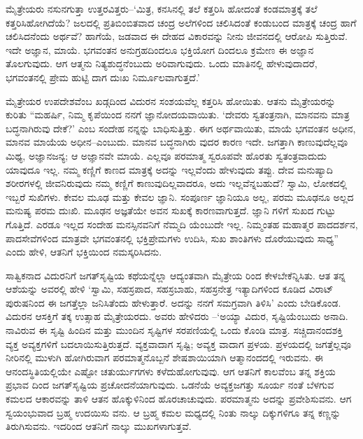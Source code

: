 ಮೈತ್ರೇಯರು ನಸುನಗುತ್ತಾ ಉತ್ತರವಿತ್ತರು–‘ಮಿತ್ರ, ಕನಸಿನಲ್ಲಿ ತಲೆ ಕತ್ತರಿಸಿ ಹೋದಂತೆ ಕಂಡಮಾತ್ರಕ್ಕೆ ತಲೆ ಕತ್ತರಿಸಿಹೋಗಿದೆಯೆ? ಜಲದಲ್ಲಿ ಪ್ರತಿಬಿಂಬಿತವಾದ ಚಂದ್ರ ಅಲೆಗಳಿಂದ ಚಲಿಸಿದಂತೆ ಕಂಡುಬಂದ ಮಾತ್ರಕ್ಕೆ ಚಂದ್ರ ಹಾಗೆ ಚಲಿಸಿದನೆಂದು ಅರ್ಥವೆ? ಹಾಗೆಯೆ, ಜಡವಾದ ಈ ದೇಹದ ವಿಕಾರವನ್ನು ನೀನು ಜೀವನದಲ್ಲಿ ಆರೋಪಿ ಸುತ್ತಿರುವೆ. ಇದೇ ಅಜ್ಞಾನ, ಮಾಯೆ. ಭಗವಂತನ ಅನುಗ್ರಹದಿಂದಲೂ ಭಕ್ತಿಯೋಗ ದಿಂದಲೂ ಕ್ರಮೇಣ ಈ ಅಜ್ಞಾನ ತೊಲಗುವುದು. ಆಗ ಆತ್ಮನು ನಿತ್ಯಶುದ್ಧನೆಂಬುದು ಅರಿವಾಗುವುದು. ಒಂದು ಮಾತಿನಲ್ಲಿ ಹೇಳುವುದಾದರೆ, ಭಗವಂತನಲ್ಲಿ ಪ್ರೇಮ ಹುಟ್ಟಿ ದಾಗ ದುಃಖ ನಿರ್ಮೂಲವಾಗುತ್ತದೆ.’

ಮೈತ್ರೇಯರ ಉಪದೇಶವೆಂಬ ಖಡ್ಗದಿಂದ ವಿದುರನ ಸಂಶಯವೆಲ್ಲ ಕತ್ತರಿಸಿ ಹೋಯಿತು. ಆತನು ಮೈತ್ರೇಯರನ್ನು ಕುರಿತು “ಮಹರ್ಷಿ, ನಿಮ್ಮ ಕೃಪೆಯಿಂದ ನನಗೆ ಜ್ಞಾನೋದಯವಾಯಿತು. ‘ದೇವರು ಸ್ವತಂತ್ರನಾಗಿ, ಮಾನವನು ಮಾತ್ರ ಬದ್ಧನಾಗಿರುವು ದೇಕೆ?’ ಎಂಬ ಸಂದೇಹ ನನ್ನನ್ನು ಬಾಧಿಸುತ್ತಿತ್ತು. ಈಗ ಅರ್ಥವಾಯಿತು, ಮಾಯೆ ಭಗವಂತನ ಅಧೀನ, ಮಾನವ ಮಾಯೆಯ ಅಧೀನ–ಎಂಬುದು. ಮಾನವ ಬದ್ಧನಾಗಿರು ವುದರ ಕಾರಣ ಇದೇ. ಜಗತ್ತಾಗಿ ಕಾಣುವುದೆಲ್ಲವೂ ಮಿಥ್ಯ, ಅಜ್ಞಾನಜನ್ಯ; ಆ ಅಜ್ಞಾನವೇ ಮಾಯೆ. ಎಲ್ಲವೂ ಪರಮಾತ್ಮ ಸ್ವರೂಪವೇ ಹೊರತು ಸ್ವತಂತ್ರವಾದುದು ಯಾವುದೂ ಇಲ್ಲ. ನಮ್ಮ ಕಣ್ಣಿಗೆ ಕಾಣದ ಮಾತ್ರಕ್ಕೆ ಅದನ್ನು ಇಲ್ಲವೆಂದು ಹೇಳುವುದು ತಪ್ಪು. ದೇವ ಮನುಷ್ಯಾದಿ ಶರೀರಗಳಲ್ಲಿ ಜೀವನಿರುವುದು ನಮ್ಮ ಕಣ್ಣಿಗೆ ಕಾಣುವುದಿಲ್ಲವಾದರೂ, ಅದು ಇಲ್ಲವೆನ್ನಬಹುದೆ? ಸ್ವಾಮಿ, ಲೋಕದಲ್ಲಿ ಇಬ್ಬರೆ ಸುಖಿಗಳು. ಕೇವಲ ಮೂಢ ಮತ್ತು ಕೇವಲ ಜ್ಞಾನಿ. ಸಂಪೂರ್ಣ ಜ್ಞಾನಿಯೂ ಅಲ್ಲ, ಪರಮ ಮೂಢನೂ ಅಲ್ಲದ ಮನುಷ್ಯ ಪರಮ ದುಃಖಿ. ಮೂಢನ ಅಜ್ಞತೆಯೇ ಅವನ ಸುಖಕ್ಕೆ ಕಾರಣವಾಗುತ್ತದೆ. ಜ್ಞಾನಿ ಗಳಿಗೆ ಸುಖದ ಗುಟ್ಟು ಗೊತ್ತಿದೆ. ಎರಡೂ ಇಲ್ಲದ ಸಂದೇಹ ಮನಸ್ಸಿನವನಿಗೆ ನೆಮ್ಮದಿ ಯೆಂಬುದೇ ಇಲ್ಲ. ನಿಮ್ಮಂತಹ ಮಹಾತ್ಮರ ಪಾದದರ್ಶನ, ಪಾದಸೇವೆಗಳಿಂದ ಮಾತ್ರವೇ ಭಗವಂತನಲ್ಲಿ ಭಕ್ತಿಪ್ರೇಮಗಳು ಉದಿಸಿ, ಸುಖ ಶಾಂತಿಗಳು ದೊರೆಯುವುದು ಸಾಧ್ಯ” ಎಂದು ಹೇಳಿ, ಆತನಿಗೆ ಭಕ್ತಿಯಿಂದ ನಮಸ್ಕರಿಸಿದನು.

ಸಾತ್ವಿಕನಾದ ವಿದುರನಿಗೆ ಜಗತ್​ಸೃಷ್ಟಿಯ ಕಥೆಯನ್ನೆಲ್ಲಾ ಆದ್ಯಂತವಾಗಿ ಮೈತ್ರೇಯ ರಿಂದ ಕೇಳಬೇಕೆನ್ನಿಸಿತು. ಆತ ತನ್ನ ಆಶೆಯನ್ನು ಅವರಲ್ಲಿ ಹೇಳಿ ‘ಸ್ವಾಮಿ, ಸಹಸ್ರಪಾದ, ಸಹಸ್ರಬಾಹು, ಸಹಸ್ರನೇತ್ರ ಇತ್ಯಾದಿಗಳಿಂದ ಕೂಡಿದ ವಿರಾಟ್​ಪುರುಷನಿಂದ ಈ ಜಗತ್ತೆಲ್ಲಾ ಜನಿಸಿತೆಂದು ಹೇಳುತ್ತಾರೆ. ಅದನ್ನು ನನಗೆ ಸಮಗ್ರವಾಗಿ ತಿಳಿಸಿ’ ಎಂದು ಬೇಡಿಕೊಂಡ. ವಿದುರನ ಆಸಕ್ತಿಗೆ ತಕ್ಕ ಉತ್ಸಾಹ ಮೈತ್ರೇಯರದು. ಅವರು ಹೇಳಿದರು –‘ಅಯ್ಯಾ ವಿದುರ, ಸೃಷ್ಟಿಯೆಂಬುದು ಅನಾದಿ. ನಾವಿರುವ ಈ ಸೃಷ್ಟಿ ಹಿಂದಿನ ಮತ್ತು ಮುಂದಿನ ಸೃಷ್ಟಿಗಳ ಸರಪಣಿಯಲ್ಲಿ ಒಂದು ಕೊಂಡಿ ಮಾತ್ರ. ಸಚ್ಚಿದಾನಂದಶಕ್ತಿ ವ್ಯಕ್ತ ಅವ್ಯಕ್ತಗಳಿಗೆ ಬದಲಾಯಿಸುತ್ತಿರುತ್ತದೆ. ವ್ಯಕ್ತವಾದಾಗ ಸೃಷ್ಟಿ; ಅವ್ಯಕ್ತ ವಾದಾಗ ಪ್ರಳಯ. ಪ್ರಳಯದಲ್ಲಿ ಜಗತ್ತೆಲ್ಲವೂ ನೀರಿನಲ್ಲಿ ಮುಳುಗಿ ಹೋಗಿರುವಾಗ ಪರಮಾತ್ಮನೊಬ್ಬನೆ ಶೇಷಶಾಯಿಯಾಗಿ ಆತ್ಮಾನಂದದಲ್ಲಿ ಇರುವನು. ಈ ಆನಂದಸ್ಥಿತಿಯಲ್ಲಿಯೇ ಎಷ್ಟೋ ಚತುರ್ಯುಗಗಳು ಕಳೆದುಹೋಗುವುವು. ಆಗ ಆತನಿಗೆ ಕಾಲವೆಂಬ ತನ್ನ ಶಕ್ತಿಯ ಪ್ರಭಾವ ದಿಂದ ಜಗತ್​ಸೃಷ್ಟಿಯ ಪ್ರಚೋದನೆಯಾಗುವುದು. ಒಡನೆಯೆ ಅವ್ಯಕ್ತಜಗತ್ತು ಸೂರ್ಯ ನಂತೆ ಬೆಳಗುವ ಕಮಲದ ಆಕಾರವನ್ನು ತಾಳಿ ಆತನ ಹೊಕ್ಕುಳಿನಿಂದ ಹೊರಚಾಚುವುದು. ಪರಮಾತ್ಮನು ಅದನ್ನು ಪ್ರವೇಶಿಸುವನು. ಆಗ ಸ್ವಯಂಭುವಾದ ಬ್ರಹ್ಮ ಉದಯಿಸು ವನು. ಆ ಬ್ರಹ್ಮ ಕಮಲ ಮಧ್ಯದಲ್ಲಿ ನಿಂತು ನಾಲ್ಕು ದಿಕ್ಕುಗಳಿಗೂ ತನ್ನ ಕಣ್ಣನ್ನು ತಿರುಗಿಸುವನು. ಇದರಿಂದ ಆತನಿಗೆ ನಾಲ್ಕು ಮುಖಗಳಾಗುತ್ತವೆ.

